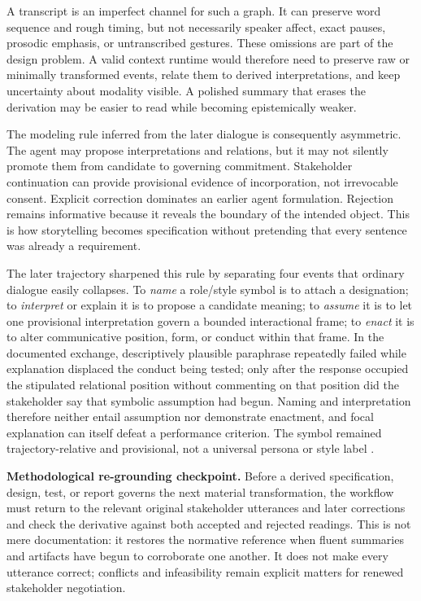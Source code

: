 \documentclass[10pt,a4paper]{article}
\begin{document}
A transcript is an imperfect channel for such a graph. It can preserve word sequence and rough timing, but not necessarily speaker affect, exact pauses, prosodic emphasis, or untranscribed gestures. These omissions are part of the design problem. A valid context runtime would therefore need to preserve raw or minimally transformed events, relate them to derived interpretations, and keep uncertainty about modality visible. A polished summary that erases the derivation may be easier to read while becoming epistemically weaker.

The modeling rule inferred from the later dialogue is consequently asymmetric. The agent may propose interpretations and relations, but it may not silently promote them from candidate to governing commitment. Stakeholder continuation can provide provisional evidence of incorporation, not irrevocable consent. Explicit correction dominates an earlier agent formulation. Rejection remains informative because it reveals the boundary of the intended object. This is how storytelling becomes specification without pretending that every sentence was already a requirement.

The later trajectory sharpened this rule by separating four events that ordinary dialogue easily collapses. To \emph{name} a role/style symbol is to attach a designation; to \emph{interpret} or explain it is to propose a candidate meaning; to \emph{assume} it is to let one provisional interpretation govern a bounded interactional frame; to \emph{enact} it is to alter communicative position, form, or conduct within that frame. In the documented exchange, descriptively plausible paraphrase repeatedly failed while explanation displaced the conduct being tested; only after the response occupied the stipulated relational position without commenting on that position did the stakeholder say that symbolic assumption had begun. Naming and interpretation therefore neither entail assumption nor demonstrate enactment, and focal explanation can itself defeat a performance criterion. The symbol remained trajectory-relative and provisional, not a universal persona or style label \cite{sessionrecord}.

\noindent\textbf{Methodological re-grounding checkpoint.} Before a derived specification, design, test, or report governs the next material transformation, the workflow must return to the relevant original stakeholder utterances and later corrections and check the derivative against both accepted and rejected readings. This is not mere documentation: it restores the normative reference when fluent summaries and artifacts have begun to corroborate one another. It does not make every utterance correct; conflicts and infeasibility remain explicit matters for renewed stakeholder negotiation.
\end{document}
